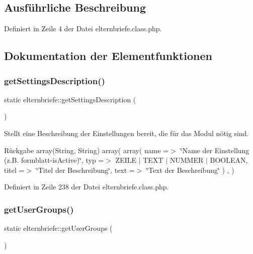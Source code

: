 \subsection{Ausführliche Beschreibung}


Definiert in Zeile 4 der Datei elternbriefe.\+class.\+php.



\subsection{Dokumentation der Elementfunktionen}
\mbox{\label{classelternbriefe_a13d7c07f33fa27d7a368173cfe888418}} 
\subsubsection{\texorpdfstring{get\+Settings\+Description()}{getSettingsDescription()}}
{\footnotesize\ttfamily static elternbriefe\+::get\+Settings\+Description (\begin{DoxyParamCaption}{ }\end{DoxyParamCaption})\hspace{0.3cm}{\ttfamily [static]}}

Stellt eine Beschreibung der Einstellungen bereit, die für das Modul nötig sind. \begin{DoxyReturn}{Rückgabe}
array(\+String, String) array( array( \textquotesingle{}name\textquotesingle{} =$>$ \char`\"{}\+Name der Einstellung (z.\+B. formblatt-\/is\+Active)\char`\"{}, \textquotesingle{}typ\textquotesingle{} =$>$ Z\+E\+I\+LE $\vert$ T\+E\+XT $\vert$ N\+U\+M\+M\+ER $\vert$ B\+O\+O\+L\+E\+AN, \textquotesingle{}titel\textquotesingle{} =$>$ \char`\"{}\+Titel der Beschreibung\char`\"{}, \textquotesingle{}text\textquotesingle{} =$>$ \char`\"{}\+Text der Beschreibung\char`\"{} ) , ) 
\end{DoxyReturn}


Definiert in Zeile 238 der Datei elternbriefe.\+class.\+php.

\mbox{\label{classelternbriefe_a24714ea5e6fd9c082d62f003e13b5e4d}} 
\subsubsection{\texorpdfstring{get\+User\+Groups()}{getUserGroups()}}
{\footnotesize\ttfamily static elternbriefe\+::get\+User\+Groups (\begin{DoxyParamCaption}{ }\end{DoxyParamCaption})\hspace{0.3cm}{\ttfamily [static]}}

